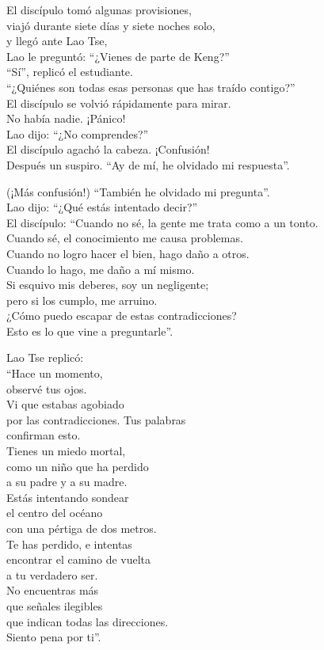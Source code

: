 \documentclass[hidelinks]{memoir}
\begin{document}
	El discípulo tomó algunas provisiones,\\
	viajó durante siete días y siete noches solo,\\
	y llegó ante Lao Tse,\\
	Lao le preguntó: ``¿Vienes de parte de Keng?''\\
	``Sí'', replicó el estudiante.\\
	``¿Quiénes son todas esas personas que has traído contigo?''\\
	El discípulo se volvió rápidamente para mirar.\\
	No había nadie. ¡Pánico!\\
	Lao dijo: ``¿No comprendes?''\\
	El discípulo agachó la cabeza. ¡Confusión!\\
	Después un suspiro. ``Ay de mí, he olvidado mi respuesta''.
	
	(¡Más confusión!) ``También he olvidado mi pregunta''.\\
	Lao dijo: ``¿Qué estás intentado decir?''\\
	El discípulo: ``Cuando no sé, la gente me trata como a un tonto.\\
	Cuando sé, el conocimiento me causa problemas.\\
	Cuando no logro hacer el bien, hago daño a otros.\\
	Cuando lo hago, me daño a mí mismo.\\
	Si esquivo mis deberes, soy un negligente;\\
	pero si los cumplo, me arruino.\\
	¿Cómo puedo escapar de estas contradicciones?\\
	Esto es lo que vine a preguntarle''.
	
	Lao Tse replicó:\\
	``Hace un momento,\\
	observé tus ojos.\\
	Vi que estabas agobiado\\
	por las contradicciones. Tus palabras\\
	confirman esto.\\
	Tienes un miedo mortal,\\
	como un niño que ha perdido\\
	a su padre y a su madre.\\
	Estás intentando sondear\\
	el centro del océano\\
	con una pértiga de dos metros.\\
	Te has perdido, e intentas\\
	encontrar el camino de vuelta\\
	a tu verdadero ser.\\
	No encuentras más\\
	que señales ilegibles\\
	que indican todas las direcciones.\\
	Siento pena por ti''.
	
\end{document}
